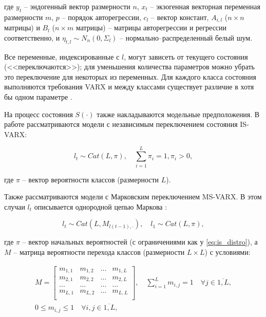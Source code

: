 \documentclass[a4paper,14pt]{extreport}
\begin{document}
\noindent
где 
$y_t$ -- эндогенный вектор размерности $n$, 
$x_{t}$ -- экзогенная векторная переменная размерности $m$,
$p$ -- порядок авторегрессии, 
$c_{l}$ -- вектор констант,
$A_{i,l}$ ($n \times n$ матрицы) и $B_{l}$ ($n \times m$ матрицы) -- матрицы авторегрессии и регрессии соответственно,
и $\eta_{t, l} \sim N_n(0, \Sigma_{l}) $ -- нормально–распределенный белый шум.

Все переменные, индексированные с $l$, могут зависеть от текущего состояния (<<переключаются>>); для уменьшения количества параметров можно убрать это переключение для некоторых из переменных. Для каждого класса состояния выполняются требования VARX и между классами существует различие в хотя бы одном параметре \cite{malNovopMSVARX}.

На процесс состояния $S(\cdot)$ также накладываются модельные предположения. В работе рассматриваются модели с независимым переключением состояния IS-VARX:

\begin{equation}
	\label{eq:is_distro}
	l_t \sim \mathit{Cat}(L, \pi), \quad \sum_{i=1}^{L}{\pi_i} = 1, \pi_i > 0 ,
\end{equation}

\noindent
где $\pi$ -- вектор вероятности классов (размерности $L$).

Также рассматриваются модели с Марковским переключением MS-VARX. 
В этом случаи $l_t$ описывается однородной цепью Маркова  \cite{malNovopMSVARX}:

\begin{equation}
	l_t \sim \mathit{Cat}(L, M_{l(t-1), \cdot}),
	\quad 
	l_1 \sim \mathit{Cat}(L, \pi) ,
\end{equation}

\noindent
где $\pi$ -- вектор начальных вероятностей (с ограничениями как у \ref{eq:is_distro}), а $M$ -- матрица вероятности перехода классов (размерности $L \times L$) с условиями:

\begin{equation}
	\begin{multlined}
		M=
		\left[
			{
					\begin{array}{cccc}
						m_{1,1} & m_{1,2} & ... & m_{1,L} \\
						m_{2,1} & m_{2,2} & ... & m_{2,L} \\
						...     & ...     & ... & ...     \\
						m_{L,1} & m_{L,2} & ... & m_{L,L} \\
					\end{array}
				}
			\right]
		, \quad
		\sum_{i=1}^{L} m_{i,j} = 1 \quad \forall j \in \overline{1,L}
		,
		\\
		0 \le m_{i,j} \le 1 \quad \forall i, j \in \overline{1,L},
	\end{multlined}
\end{equation}
\end{document}

